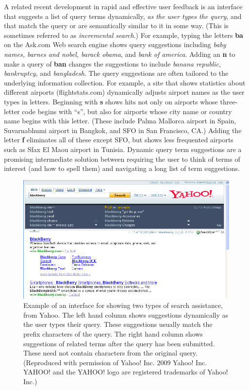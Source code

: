 \documentclass[sigconf,nonacm,screen,pbalance]{acmart}
\begin{document}
A related recent development in rapid and effective user feedback is an interface that suggests a list
of query terms dynamically, {\em  as the user types the query}, and that match the query or are
semantically similar to it in some way. (This is sometimes referred to as {\em  incremental search}.)
For example, typing the letters {\bf  ba} on the Ask.com Web search engine shows query suggestions
including {\em  baby names, barnes and nobel, barack obama}, and {\em  bank of america}. Adding an {\bf 
n} to make a query of {\bf  ban} changes the suggestions to include {\em  banana republic,
bankruptcy}, and {\em  bangladesh}. The query suggestions are often tailored to the underlying
information collection. For example, a site that shows statistics about different airports
(flightstats.com) dynamically adjusts airport names as the user types in letters. Beginning with {\bf 
s} shows hits not only on airports whose three-letter code begins with ``s'', but also for airports
whose city name or country name begins with this letter. (These include Palma Mallorca airport in Spain,
Suvarnabhumi airport in Bangkok, and SFO in San Francisco, CA.) Adding the letter {\bf  f} eliminates
all of these except SFO, but shows less frequented airports such as Sfax El Maou airport in Tunisia.
Dynamic query term suggestions are a promising intermediate solution between requiring the user to think
of terms of interest (and how to spell them) and navigating a long list of term suggestions.

\begin{figure}[ht]
    \vspace{-5pt}
    \includegraphics[width=\columnwidth]{./yahoo-search-assist.png}
    \vspace{-20pt}
    \caption{Example of an interface for showing two types of search
    assistance, from Yahoo. The left hand column shows suggestions dynamically as the user types their
    query. These suggestions usually match the prefix characters of the query. The right hand column shows
    suggestions of related terms after the query has been submitted. These need not contain characters
    from the original query. (Reproduced with permission of Yahoo! Inc. 2009 Yahoo! Inc. YAHOO! and the
    YAHOO! logo are registered trademarks of Yahoo! Inc.)}
    \label{fig:figure-4}
    \vspace{-5pt}
\end{figure}
\end{document}
